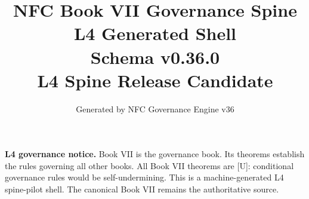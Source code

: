 \documentclass[11pt]{article}
\title{NFC Book VII Governance Spine L4 Generated Shell\\[1ex]\large Schema v0.36.0\\[0.5ex]\normalsize L4 Spine Release Candidate}
\author{Generated by NFC Governance Engine v36}
\date{}
\begin{document}
\maketitle
\tableofcontents
\bigskip
\noindent\textbf{L4 governance notice.} Book VII is the governance book.
Its theorems establish the rules governing all other books.
All Book VII theorems are [U]: conditional governance rules would be self-undermining.
This is a machine-generated L4 spine-pilot shell.
The canonical Book VII remains the authoritative source.
\vspace{1em}

\end{document}
